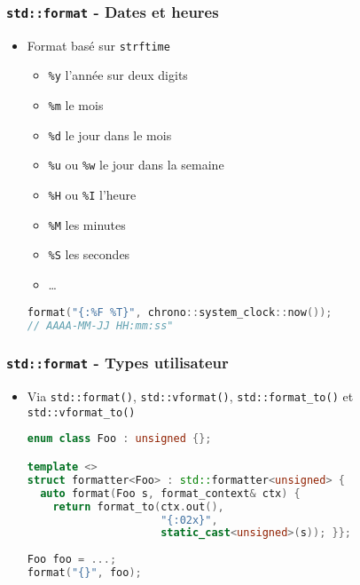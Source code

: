 \documentclass[C++.tex]{subfiles}
\begin{document}
\begin{frame}[fragile]
	\frametitle{\lstinline|std::format| - Dates et heures}
	\begin{itemize}
		\item Format basé sur \lstinline|strftime|
		\begin{itemize}
			\item \lstinline|%y| l'année sur deux digits
			\item \lstinline|%m| le mois
			\item \lstinline|%d| le jour dans le mois
			\item \lstinline|%u| ou \lstinline|%w| le jour dans la semaine


			\item \lstinline|%H| ou \lstinline|%I| l'heure

			
			\item \lstinline|%M| les minutes
			\item \lstinline|%S| les secondes
			\item \ldots
		\end{itemize}

		\begin{lstlisting}[language=C++]
format("{:%F %T}", chrono::system_clock::now());
// AAAA-MM-JJ HH:mm:ss"\end{lstlisting}
	\end{itemize}
\end{frame}

\begin{frame}[fragile]
	\frametitle{\lstinline|std::format| - Types utilisateur}
	\begin{itemize}
		\item Via \lstinline|std::format()|, \lstinline|std::vformat()|, \lstinline|std::format_to()| et \lstinline|std::vformat_to()|
		\begin{lstlisting}[language=C++]
enum class Foo : unsigned {};

template <>
struct formatter<Foo> : std::formatter<unsigned> {
  auto format(Foo s, format_context& ctx) {
    return format_to(ctx.out(), 
                     "{:02x}", 
                     static_cast<unsigned>(s)); }};
                     
Foo foo = ...;
format("{}", foo);\end{lstlisting}


	\end{itemize}
\end{frame}
\end{document}
